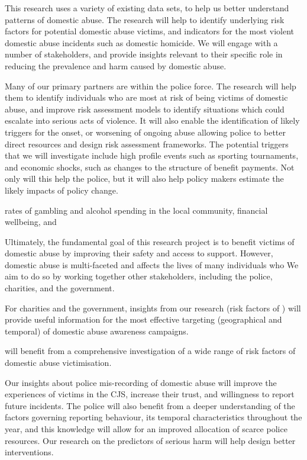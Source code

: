\documentclass[11pt, a4paper]{article}
\begin{document}
This research uses a variety of existing data sets, to help us better understand patterns of domestic abuse. The research will help to identify underlying risk factors for potential domestic abuse victims, and indicators for the most violent domestic abuse incidents such as domestic homicide. We will engage with a number of stakeholders, and provide insights relevant to their specific role in reducing the prevalence and harm caused by domestic abuse. 

Many of our primary partners are within the police force. The research will help them to identify individuals who are most at risk of being victims of domestic abuse, and improve risk assessment models to identify situations which could escalate into serious acts of violence. It will also enable the identification of likely triggers for the onset, or worsening of ongoing abuse allowing police to better direct resources and design risk assessment frameworks. The potential triggers that we will investigate include high profile events such as sporting tournaments, and economic shocks, such as changes to the structure of benefit payments. Not only will this help the police, but it will also help policy makers estimate the likely impacts of policy change.




rates of gambling and alcohol spending in the local community, financial wellbeing, and 

Ultimately, the fundamental goal of this research project is to benefit victims of domestic abuse by improving their safety and access to support. However, domestic abuse is multi-faceted and affects the lives of many individuals who  We aim to do so by working together other stakeholders, including the police, charities, and the government.

For charities and the government, insights from our research (risk factors of ) will provide useful information for the most effective targeting (geographical and temporal) of domestic abuse awareness campaigns. 

 will benefit from a comprehensive investigation of a wide range of risk factors of domestic abuse victimisation.

Our insights about police mis-recording of domestic abuse will improve the experiences of victims in the CJS, increase their trust, and willingness to report future incidents. The police will also benefit from a deeper understanding of the factors governing reporting behaviour, its temporal characteristics throughout the year, and this knowledge will allow for an improved allocation of scarce police resources. Our research on the predictors of serious harm will help design better interventions.
\end{document}
